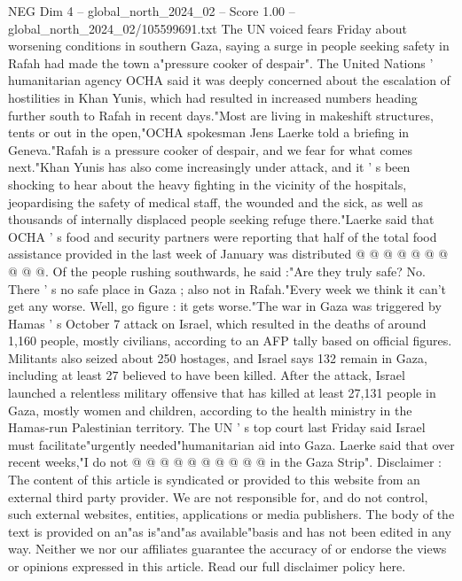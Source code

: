 \begin{textsample}{NEG Dim 4 – global\_north\_2024\_02 – Score 1.00 – global\_north\_2024\_02/105599691.txt}  \label{ex:f4_neg_285}
The UN voiced fears Friday about worsening conditions in southern Gaza, saying a surge in people seeking safety in Rafah had made the town a"pressure cooker of despair".
The United Nations ' humanitarian agency OCHA said it was deeply concerned about the escalation of hostilities in Khan Yunis, which had resulted in increased numbers heading further south to Rafah in recent days."Most are living in makeshift structures, tents or out in the open,"OCHA spokesman Jens Laerke told a briefing in Geneva."Rafah is a pressure cooker of despair, and we fear for what comes next."Khan Yunis has also come increasingly under attack, and it ' s been shocking to hear about the heavy fighting in the vicinity of the hospitals, jeopardising the safety of medical staff, the wounded and the sick, as well as thousands of internally displaced people seeking refuge there."Laerke said that OCHA ' s food and security partners were reporting that half of the total food assistance provided in the last week of January was distributed @ @ @ @ @ @ @ @ @ @.
Of the people rushing southwards, he said :"Are they truly safe?
No.
There ' s no safe place in Gaza ; also not in Rafah."Every week we think it can't get any worse.
Well, go figure : it gets worse."The war in Gaza was triggered by Hamas ' s October 7 attack on Israel, which resulted in the deaths of around 1,160 people, mostly civilians, according to an AFP tally based on official figures.
Militants also seized about 250 hostages, and Israel says 132 remain in Gaza, including at least 27 believed to have been killed.
After the attack, Israel launched a relentless military offensive that has killed at least 27,131 people in Gaza, mostly women and children, according to the health ministry in the Hamas-run Palestinian territory.
The UN ' s top court last Friday said Israel must facilitate"urgently needed"humanitarian aid into Gaza.
Laerke said that over recent weeks,"I do not @ @ @ @ @ @ @ @ @ @ in the Gaza Strip".
Disclaimer : The content of this article is syndicated or provided to this website from an external third party provider.
We are not responsible for, and do not control, such external websites, entities, applications or media publishers.
The body of the text is provided on an"as is"and"as available"basis and has not been edited in any way.
Neither we nor our affiliates guarantee the accuracy of or endorse the views or opinions expressed in this article.
Read our full disclaimer policy here.

\end{textsample}
